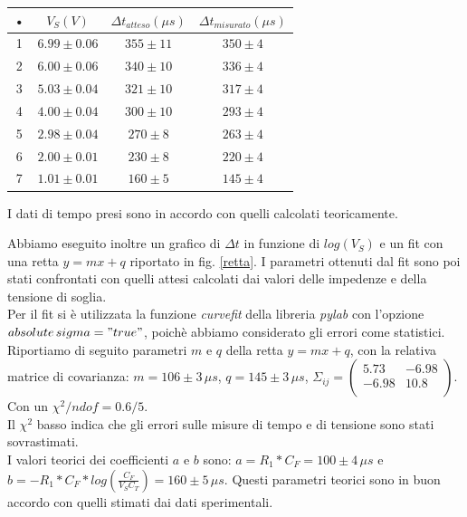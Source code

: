 \documentclass[10pt,a4paper]{article}
\begin{document}
\begin{table}[!ht]
\centering
\begin{tabular}{|c|c|c|c|}
\hline 
• & $V_{S} (V)$ & $\Delta t _ {atteso} (\mu s)$ & $\Delta t _ {misurato} (\mu s)$ \\ 
\hline
1 & $6.99 \pm 0.06$ & $355 \pm 11$ & $350 \pm 4$ \\
2 & $6.00 \pm 0.06$ & $340 \pm 10$ & $336 \pm 4$ \\  
3 & $5.03 \pm 0.04$ & $321 \pm 10$ & $317 \pm 4$ \\  
4 & $4.00 \pm 0.04$ & $300 \pm 10$ & $293 \pm 4$ \\ 
5 & $2.98 \pm 0.04$ & $270 \pm 8$ & $263 \pm 4$ \\ 
6 & $2.00 \pm 0.01$ & $230 \pm 8$ & $220 \pm 4$ \\ 
7 & $1.01 \pm 0.01$ & $160 \pm 5$ & $145 \pm 4$ \\   
\hline 
\end{tabular} 
\label{dati}
\end{table}

I dati di tempo presi sono in accordo con quelli calcolati teoricamente.

Abbiamo eseguito inoltre un grafico di $\Delta t$ in funzione di $log(V_{S})$ e un fit con una retta $y = mx + q$ riportato in fig. \ref{retta}. I parametri ottenuti dal fit sono poi stati confrontati con quelli attesi calcolati dai valori delle impedenze e della tensione di soglia.\\
Per il fit si è utilizzata la funzione \emph{curvefit} della libreria \emph{pylab} con l'opzione \emph{$absolute\,sigma = "true"$}, poichè abbiamo considerato gli errori come statistici. Riportiamo di seguito parametri $m$ e $q$ della retta $y=mx+q$, con la relativa matrice di covarianza: $m = 106 \pm 3 \, \mu s $, $q = 145\pm 3 \, \mu s$,  $ \Sigma_{ij} = \left( \begin{array}{cc}
5.73 & -6.98 \\ 
-6.98 & 10.8\\
\end{array} \right)$. Con un $\chi^2/ndof = 0.6/5$.\\

Il $\chi^2$ basso indica che gli errori sulle misure di tempo e di tensione sono stati sovrastimati.\\

I valori teorici dei coefficienti $a$ e $b$ sono: $a = R_1 * C_F = 100 \pm 4 \, \mu s$ e $b = - R_1 * C_F * log \left( \frac{C_F}{V_S C_T}\right) = 160 \pm 5 \, \mu s$. Questi parametri teorici sono in buon accordo con quelli stimati dai dati sperimentali.\\
\end{document}

